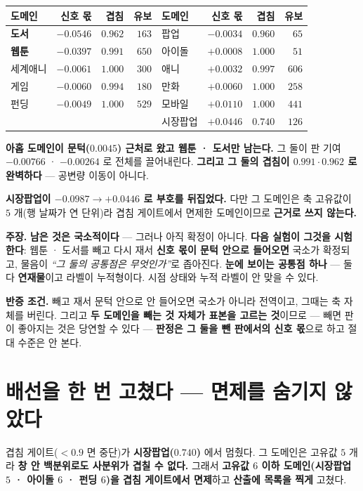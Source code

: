 \documentclass[10pt,a4paper]{article}
\newcommand{\claim}[2]{\begin{claimbox}\textbf{주장.} #1\par\smallskip
  \textcolor{gray!70}{\textbf{반증 조건.} #2}\end{claimbox}}
\begin{document}
\begin{center}
\begin{tabular}{lrrr|lrrr}
\toprule
도메인 & 신호 몫 & 겹침 & 유보 & 도메인 & 신호 몫 & 겹침 & 유보 \\
\midrule
\textbf{도서} & $\mathbf{-0.0546}$ & $0.962$ & $163$ & 팝업 & $-0.0034$ & $0.960$ & $65$ \\
\textbf{웹툰} & $\mathbf{-0.0397}$ & $0.991$ & $650$ & 아이돌 & $+0.0008$ & $1.000$ & $51$ \\
세계애니 & $-0.0061$ & $1.000$ & $300$ & 애니 & $+0.0032$ & $0.997$ & $606$ \\
게임 & $-0.0060$ & $0.994$ & $180$ & 만화 & $+0.0060$ & $1.000$ & $258$ \\
펀딩 & $-0.0049$ & $1.000$ & $529$ & 모바일 & $+0.0110$ & $1.000$ & $441$ \\
& & & & 시장팝업 & $+0.0446$ & $0.740$ & $126$ \\
\bottomrule
\end{tabular}
\end{center}

\textbf{아홉 도메인이 문턱($0.0045$) 근처로 왔고 웹툰 · 도서만 남는다.} 그 둘이 판
기여 $-0.00766$ · $-0.00264$ 로 전체를 끌어내린다. \textbf{그리고 그 둘의 겹침이
$0.991 \cdot 0.962$ 로 완벽하다} --- 공변량 이동이 아니다.

\textbf{시장팝업이 $-0.0987 \to +0.0446$ 로 부호를 뒤집었다.} 다만 그 도메인은 축
고유값이 $5$ 개(행 날짜가 연 단위)라 겹침 게이트에서 면제한 도메인이므로
\textbf{근거로 쓰지 않는다.}

\claim{\textbf{남은 것은 국소적이다} --- 그러나 아직 확정이 아니다. \textbf{다음
실험이 그것을 시험한다}: 웹툰 · 도서를 빼고 다시 재서 \textbf{신호 몫이 문턱 안으로
들어오면} 국소가 확정되고, 물음이 \emph{``그 둘의 공통점은 무엇인가''}로 좁아진다.
\textbf{눈에 보이는 공통점 하나} --- 둘 다 \textbf{연재물}이고 라벨이 누적형이다.
시점 상태와 누적 라벨이 안 맞을 수 있다.}
{빼고 재서 문턱 안으로 안 들어오면 국소가 아니라 전역이고, 그때는 축 자체를 버린다.
그리고 \textbf{두 도메인을 빼는 것 자체가 표본을 고르는 것}이므로 --- 빼면 판이
좋아지는 것은 당연할 수 있다 --- \textbf{판정은 그 둘을 뺀 판에서의 신호 몫}으로
하고 절대 수준은 안 본다.}

\section{배선을 한 번 고쳤다 --- 면제를 숨기지 않았다}

겹침 게이트($<0.9$ 면 중단)가 \textbf{시장팝업($0.740$)} 에서 멈췄다. 그 도메인은
고유값 $5$ 개라 \textbf{창 안 백분위로도 사분위가 겹칠 수 없다.} 그래서 \textbf{고유값
$6$ 이하 도메인(시장팝업 $5$ · 아이돌 $6$ · 펀딩 $6$)을 겹침 게이트에서 면제}하고
\textbf{산출에 목록을 찍게} 고쳤다.
\end{document}
